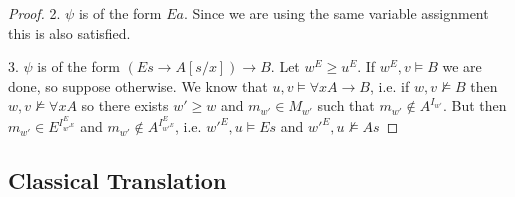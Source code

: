 \documentclass[a4paper,12pt]{report}
\theoremstyle{definition}
\theoremstyle{definition}
\theoremstyle{definition}
\theoremstyle{definition}
\theoremstyle{definition}
\theoremstyle{definition}
\theoremstyle{definition}
\begin{document}
\begin{proof}
		2. $\psi$ is of the form $Ea$. Since we are using the same variable assignment this is also satisfied.
		
		3. $\psi$ is of the form $(Es\to A[s/x])\to B$. Let $w^E\geq u^E$. If $w^E, v\models B$ we are done, so suppose otherwise. We know that $u, v\models \forall xA\to B$, i.e. if $w, v\not\models B$ then $w, v\not\models \forall xA$ so there exists $w' \geq w$ and $m_{w'}\in M_{w'}$ such that $m_{w'}\notin A^{I_{w'}}$. But then $m_{w'}\in E^{I_{w'^E}^E}$ and $m_{w'}\notin A^{I_{w'^E}^E}$, i.e. $w'^E, u\models Es$ and $w'^E, u\not\models As$
	\end{proof}
	
	\subsection{Classical Translation}
	
\end{document}
